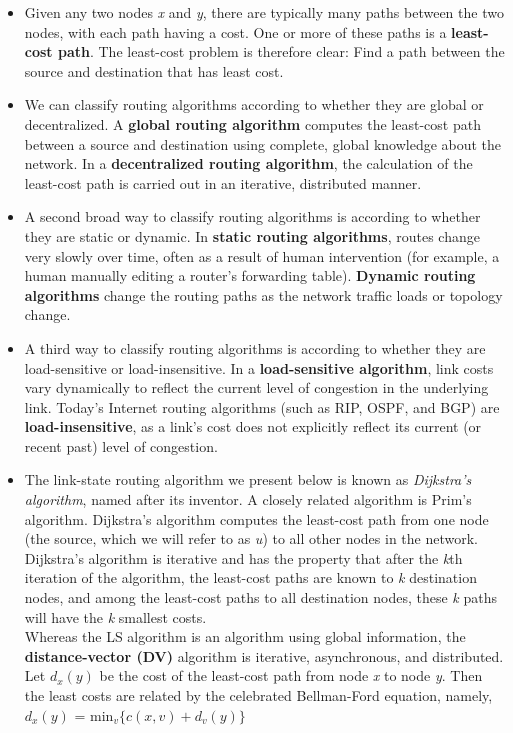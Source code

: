 \begin{itemize}
\item
Given any two nodes \textit{x} and \textit{y}, there are typically many paths between the two nodes, with each path having a cost. One or more of these paths is a \textbf{least-cost path}. The least-cost problem is therefore clear: Find a path between the source and destination that has least cost.

\item
We can classify routing algorithms according to whether they are global or decentralized. A \textbf{global routing algorithm} computes the least-cost path between a source and destination using complete, global knowledge about the network. In a \textbf{decentralized routing algorithm}, the calculation of the least-cost path is carried out in an iterative, distributed manner.


\item
A second broad way to classify routing algorithms is according to whether they are static or dynamic. In \textbf{static routing algorithms}, routes change very slowly over time, often as a result of human intervention (for example, a human manually editing a router's forwarding table). \textbf{Dynamic routing algorithms} change the routing paths as the network traffic loads or topology change.

\item
A third way to classify routing algorithms is according to whether they are load-sensitive or load-insensitive. In a \textbf{load-sensitive algorithm}, link costs vary dynamically to reflect the current level of congestion in the underlying link. Today's Internet routing algorithms (such as RIP, OSPF, and BGP) are \textbf{load-insensitive}, as a link's cost does not explicitly reflect its current (or recent past) level of congestion.

\item
The link-state routing algorithm we present below is known as \textit{Dijkstra's algorithm}, named after its inventor. A closely related algorithm is Prim's algorithm. Dijkstra's algorithm computes the least-cost path from one node (the source, which we will refer to as \textit{u}) to all other nodes in the network. Dijkstra's algorithm is iterative and has the property that after the \textit{k}th iteration of the algorithm, the least-cost paths are known to \textit{k} destination nodes, and among the least-cost paths to all destination nodes, these \textit{k} paths will have the \textit{k} smallest costs.\\
Whereas the LS algorithm is an algorithm using global information, the \textbf{distance-vector (DV)} algorithm is iterative, asynchronous, and distributed.\\
Let \(d_x(y)\) be the cost of the least-cost path from node \textit{x} to node \textit{y}. Then the least costs are related by the celebrated Bellman-Ford equation, namely,\\
\hspace*{1em}\(d_x(y)\) = min\(_v\)$\{$\(c(x,v)+d_v(y)\)$\}$


\end{itemize}

